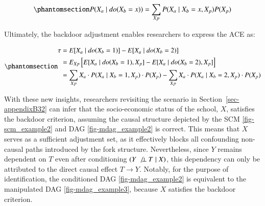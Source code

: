 \documentclass[
  authoryear,
  review,
  1p]{elsarticle}
\begin{document}
\begin{equation}\phantomsection\label{eq-backdoor}{
P(X_{a} \mid do(X_{b}=x)) = \sum_{Xp} P(X_{a} \mid X_{b}=x, X_{p}) P(X_{p})
}\end{equation}

Ultimately, the backdoor adjustment enables researchers to express the
ACE as:

\begin{equation}\phantomsection\label{eq-backdoor_adjustment}{
\begin{aligned}
\tau & = E[X_{a} \mid do(X_{b}=1)]- E[X_{a} \mid do(X_{b}=2)] \\
  & = E_{Xp}\left[ E[X_{a} \mid do(X_{b}=1), X_{p}]- E[X_{a} \mid do(X_{b}=2), X_{p}] \right] \\
  & = \sum_{Xp} X_{a} \cdot P(X_{a} \mid X_{b}=1, X_{p}) \cdot P(X_{p}) - \sum_{Xp} X_{a} \cdot P(X_{a} \mid X_{b}=2, X_{p}) \cdot P(X_{p})
\end{aligned}
}\end{equation}

With these new insights, researchers revisiting the scenario in
Section~\ref{sec-appendixB32} can infer that the socio-economic status
of the school, \(X\), satisfies the backdoor criterion, assuming the
causal structure depicted by the SCM \ref{fig-scm_example2} and DAG
\ref{fig-mdag_example2} is correct. This means that \(X\) serves as a
sufficient adjustment set, as it effectively blocks all confounding
non-causal paths introduced by the fork structure. Nevertheless, since
\(Y\) remains dependent on \(T\) even after conditioning
\((Y \:\not\bot\:T \mid X)\), this dependency can only be attributed to
the direct causal effect \(T \rightarrow Y\). Notably, for the purpose
of identification, the conditioned DAG \ref{fig-mdag_example2} is
equivalent to the manipulated DAG \ref{fig-mdag_example3}, because \(X\)
satisfies the backdoor criterion.
\end{document}
